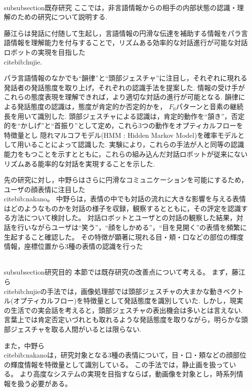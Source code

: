 \\subsubsection{既存研究}
ここでは，非言語情報からの相手の内部状態の認識・理解のための研究について説明する.

藤江らは発話に付随して生起し，言語情報の円滑な伝達を補助する情報をパラ言語情報を理解能力を付与することで，リズムある効率的な対話進行が可能な対話ロボットの実現を目指した\\cite{bib:hujie}.


パラ言語情報のなかでも``韻律''と``頭部ジェスチャ''に注目し，それぞれに現れる発話者の発話態度を取り上げ，それぞれの認識手法を提案した.
情報の受け手がこれらの態度表現を理解できれば，より適切な対話の進行が可能となる.
韻律による発話態度の認識は，態度が肯定的か否定的かを， $F_0$パターンと音素の継続長を用いて識別した.
頭部ジェスチャによる認識は，肯定的動作を``頷き''，否定的を``かしげ''と``首振り''として定め，これら3つの動作をオプティカルフローを特徴量とし 隠れマルコフモデル(HMM : Hidden Markov Model)を確率モデルとして用いることによって認識した.
実験により，これらの手法が人と同等の認識能力をもつことを示すとともに，これらの組み込んだ対話ロボットが従来にないリズムある能率的な対話を実現することを示した.

先の研究に対し，中野らはさらに円滑なコミュニケーションを可能にするため，ユーザの顔表情に注目した\\cite{bib:nakano}。
中野らは，表情の中でも対話の流れに大きな影響を与える表情はどのようなものかを対話の様子を収録，観察するとともに，その評定を認識する方法について検討した。
対話ロボットとユーザとの対話の観察した結果，対話を行いながらユーザは``笑う''，``顔をしかめる''，``目を見開く''の表情を頻繁に生起すること確認した。
その特徴が顕著に現れる目・頬・口などの部位の輝度情報，座標位置から3種の表情の認識を行った

\\subsubsection{研究目的}
本節では既存研究の改善点について考える。
まず，藤江ら \\cite{bib:hujie}の手法では，画像処理部では頭部ジェスチャの大まかな動きベクトル(オプティカルフロー)を特徴量として発話態度を識別していた.
しかし，現実の生活での実会話を考えると，頭部ジェスチャの表出機会は多いとは言えない.
言葉上では肯定否定いづれとも取れるような発話態度を取りながら，明らかな頭部ジェスチャを取る人間がいるとは限らない.

また，中野ら\\cite{bib:nakano}は，研究対象となる3種の表情について，目・口・頬などの顔部位の輝度情報を特徴量として識別している。
この手法では，静止画を扱っている。
より高度なシステムの実現を目指すならば，動画像を対象とし，時系列情報を扱う必要がある。


